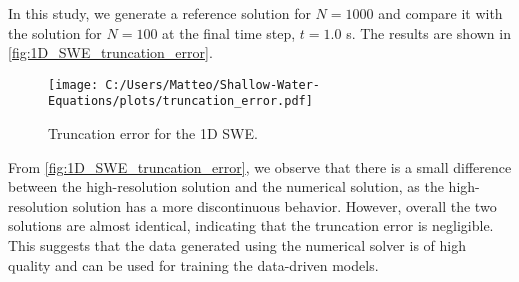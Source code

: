 In this study, we generate a reference solution for $N = 1000$ and compare it with the solution for $N = 100$ at the final time step, $t = 1.0$ s.
The results are shown in \autoref{fig:1D_SWE_truncation_error}.
\begin{figure}[H]
    \centering
    \texttt{[image: C:/Users/Matteo/Shallow-Water-Equations/plots/truncation\_error.pdf]}
    \caption{Truncation error for the 1D SWE.}\label{fig:1D_SWE_truncation_error}
\end{figure}
From \autoref{fig:1D_SWE_truncation_error}, we observe that there is a small difference between the high-resolution solution and the numerical solution, as the high-resolution solution has a more discontinuous behavior.
However, overall the two solutions are almost identical, indicating that the truncation error is negligible.
This suggests that the data generated using the numerical solver is of high quality and can be used for training the data-driven models.

